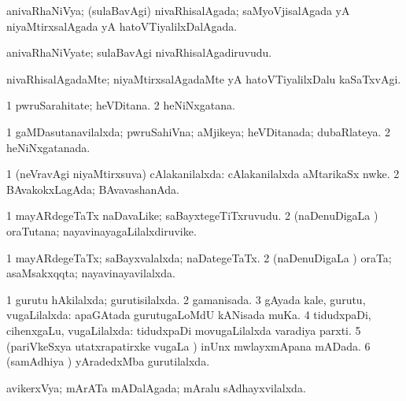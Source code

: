 \bentry
{} 
\gl{\gu}
\expl{}
\bmng
anivaRhaNiVya; (sulaBavAgi) nivaRhisalAgada; saMyoVjisalAgada yA niyaMtirxsalAgada yA hatoVTiyalilxDalAgada. 
\emng
\eentry

\bentry
{} 
\gl{\nA}
\expl{}
\bmng
anivaRhaNiVyate; sulaBavAgi nivaRhisalAgadiruvudu. 
\emng
\eentry

\bentry
{} 
\gl{\kirxvi}
\expl{}
\bmng
nivaRhisalAgadaMte; niyaMtirxsalAgadaMte yA hatoVTiyalilxDalu kaSaTxvAgi. 
\emng
\eentry

\bentry
{} 
\gl{\nA}
\expl{}
\bmng
\bnum
\num{1} pwruSarahitate; heVDitana. 
\num{2} heNiNxgatana. 
\enum
\emng
\eentry

\bentry
{} 
\gl{\gu}
\expl{}
\bmng
\bnum
\num{1} gaMDasutanavilalxda; pwruSahiVna; aMjikeya; heVDitanada; dubaRlateya. 
\num{2} heNiNxgatanada. 
\enum
\emng
\eentry

\bentry
{} 
\gl{\gu}
\expl{}
\bmng
\bnum
\num{1} (neVravAgi niyaMtirxsuva) cAlakanilalxda:  cAlakanilalxda aMtarikaSx nwke. 
\num{2} BAvakokxLagAda; BAvavashanAda. 
\enum
\emng
\eentry

\bentry
{} 
\gl{\nA}
\expl{}
\bmng
\bnum
\num{1} mayARdegeTaTx naDavaLike; saBayxtegeTiTxruvudu. 
\num{2} (naDenuDigaLa \vi) oraTutana; nayavinayagaLilalxdiruvike. 
\enum
\emng
\eentry

\bentry
{} 
\gl{\gu}
\expl{}
\bmng
\bnum
\num{1} mayARdegeTaTx; saBayxvalalxda; naDategeTaTx. 
\num{2} (naDenuDigaLa \vi) oraTa; asaMsakxqqta; nayavinayavilalxda. 
\enum
\emng
\eentry

\bentry
{} 
\gl{\gu}
\expl{}
\bmng
\bnum
\num{1} gurutu hAkilalxda; gurutisilalxda. 
\num{2} gamanisada. 
\num{3} gAyada kale, gurutu, \mo vugaLilalxda:  apaGAtada gurutugaLoMdU kANisada muKa. 
\num{4} tidudxpaDi, cihenxgaLu, \mo vugaLilalxda:  tidudxpaDi movugaLilalxda varadiya parxti. 
\num{5} (pariVkeSxya utatxrapatirxke \mo vugaLa \vi) inUnx mwlayxmApana mADada. 
\num{6} (samAdhiya \vi) yAradedxMba gurutilalxda. 
\enum
\emng
\eentry

\bentry
{} 
\gl{\gu}
\expl{}
\bmng
avikerxVya; mArATa mADalAgada; mAralu sAdhayxvilalxda. 
\emng
\eentry


